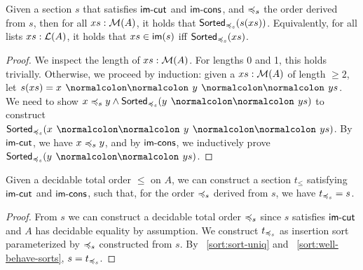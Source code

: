 \begin{proposition}\label{sort:well-behave-sorts}
    Given a section $s$ that satisfies $\operatorname{\mathsf{im-cut}}$ and $\operatorname{\mathsf{im-cons}}$,
    and $\preccurlyeq_{s}$ the order derived from $s$, then for all $xs : \mathcal{M}(A)$,
    it holds that $\operatorname{\mathsf{Sorted}}_{\preccurlyeq_{s}}(s(xs))$.
    Equivalently, for all lists $xs : \mathcal{L}(A)$,
    it holds that
    $xs \in \im{s}$ iff $\operatorname{\mathsf{Sorted}}_{\preccurlyeq_{s}}(xs)$.
\end{proposition}
\begin{proof}
    We inspect the length of $xs : \mathcal{M}(A)$.
    For lengths 0 and 1, this holds trivially.
    Otherwise, we proceed by induction:
    given a $xs : \mathcal{M}(A)$ of length $\geq 2$, let $s(xs) = x \cons y \cons ys$.
    We need to show
    $x \leqs y \land \term{Sorted}_{\leqs}(y \cons ys)$ to construct
    $\term{Sorted}_{\leqs}(x \cons y \cons ys)$.
    By $\operatorname{\mathsf{im-cut}}$, we have $x \preccurlyeq_{s} y$, and by $\operatorname{\mathsf{im-cons}}$, we
    inductively prove $\term{Sorted}_{\leqs}(y \cons ys)$.
\end{proof}

\begin{lemma}\label{sort:s2o2s}
    Given a decidable total order $\leq$ on $A$, we can construct
    a section $t_\leq$ satisfying $\operatorname{\mathsf{im-cut}}$ and $\operatorname{\mathsf{im-cons}}$,
    such that, for the order $\preccurlyeq_{s}$ derived from $s$,
    we have $t_{\preccurlyeq_{s}} = s$.
\end{lemma}
\begin{proof}
    From $s$ we can construct a decidable total order $\preccurlyeq_{s}$ since $s$ satisfies
    $\operatorname{\mathsf{im-cut}}$ and $A$ has decidable equality by assumption.
    We construct $t_{\preccurlyeq_{s}}$ as insertion sort
    parameterized by $\preccurlyeq_{s}$ constructed from $s$.
    By ~\cref{sort:sort-uniq} and ~\cref{sort:well-behave-sorts}, $s = t_{\preccurlyeq_{s}}$.
\end{proof}

